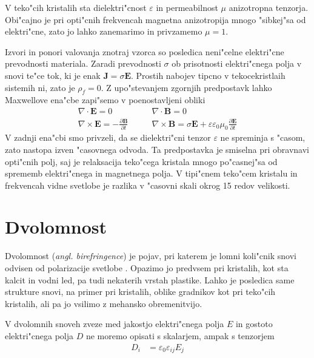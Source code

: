 \documentclass[12pt,twoside,openright,final]{report}
\newcommand{\odvod}[2]{\frac{\partial #1}{\partial #2}}
\renewcommand{\vec}{\mathbf}
\newcommand{\angl}[1]{(\textit{angl. #1})}
\begin{document}
V teko"cih kristalih sta dielektri"cnost $\varepsilon$ in permeabilnost $\mu$ anizotropna tenzorja. 
Obi"cajno je pri opti"cnih frekvencah magnetna anizotropija mnogo "sibkej"sa od elektri"cne, zato jo lahko zanemarimo in privzamemo $\mu = 1$. 

Izvori in ponori valovanja znotraj vzorca so posledica neni"celne elektri"cne prevodnosti materiala.
Zaradi prevodnosti $\sigma$ ob prisotnosti elektri"cnega polja v snovi te"ce tok, ki je enak $\vec J = \sigma \vec E$. 
Prostih nabojev tipcno v tekocekristlaih sistemih ni, zato je $\rho_f=0$. 
Z upo"stevanjem zgornjih predpostavk lahko Maxwellove ena"cbe zapi"semo v poenostavljeni obliki
\begin{equation}
  \begin{aligned}
  \nabla \cdot \vec E = 0 & \qquad \nabla \cdot \vec B = 0 \\
  \nabla \times \vec E = -\odvod{\vec B}{t} & \qquad \nabla \times \vec B = \sigma \vec E + \varepsilon\varepsilon_0\mu_0\odvod{\vec E}{t}
  \end{aligned}
\end{equation}
V zadnji ena"cbi smo privzeli, da se dielektri"cni tenzor $\varepsilon$ ne spreminja s "casom, zato nastopa izven "casovnega odvoda. 
Ta predpostavka je smiselna pri obravnavi opti"cnih polj, saj je relaksacija teko"cega kristala mnogo po"casnej"sa od sprememb elektri"cnega in magnetnega polja. 
V tipi"cnem teko"cem kristalu in frekvencah vidne svetlobe je razlika v "casovni skali okrog 15 redov velikosti. 

\section{Dvolomnost}
Dvolomnost \angl{birefringence} je pojav, pri katerem je lomni koli"cnik snovi odvisen od polarizacije svetlobe \cite{landau-lifsic-optics, wiki:birefringence}. 
Opazimo jo predvsem pri kristalih, kot sta kalcit in vodni led, pa tudi nekaterih vrstah plastike. 
Lahko je posledica same strukture snovi, na primer pri kristalih, oblike gradnikov kot pri teko"cih kristalih, ali pa jo vsilimo z mehansko obremenitvijo. 

V dvolomnih snoveh zveze med jakostjo elektri"cnega polja $E$ in gostoto elektri"cnega polja $D$ ne moremo opisati s skalarjem, ampak s tenzorjem
\begin{align}
  D_i &= \varepsilon_0 \varepsilon_{ij} E_j
\end{align}
\end{document}
